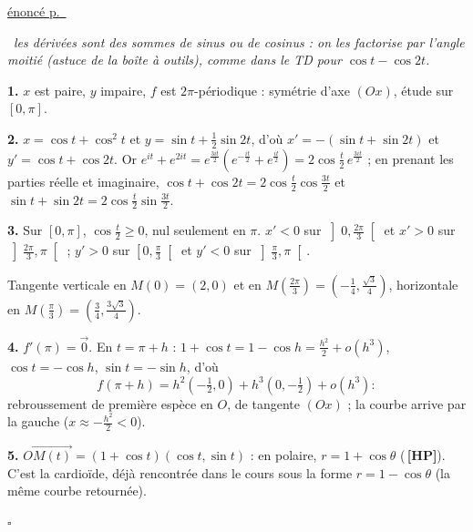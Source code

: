 \documentclass[a4paper,11pt]{article}
\numberwithin{equation}{section}
\numberwithin{figure}{section}
\numberwithin{table}{section}
\theoremstyle{enonce}
\theoremstyle{exemple}
\theoremstyle{remarque}
\newenvironment{corrige}[1]{%
  \par\needspace{6\baselineskip}\vspace{1em}\phantomsection\label{c:#1}%
  \noindent{\sffamily\bfseries\color{Bleu}Exercice~\ref{e:#1}}\quad
  {\scriptsize\sffamily\hyperref[e:#1]{\color{Gris}énoncé p.~\pageref{e:#1}}}\par\nobreak\vspace{0.2em}}%
  {\hfill\textcolor{BleuClair}{$\square$}\par}
\newcommand{\vv}[1]{\overrightarrow{#1}}
\newcommand{\ve}[1]{\vec{#1}}
\newcommand{\HP}{\,{\sffamily\bfseries\scriptsize\textcolor{Brique}{[HP]}}}
\newcommand{\demarche}[1]{\noindent{\sffamily\bfseries\small\color{BleuMoyen}Démarche.}\ \textit{#1}\par\smallskip}
\begin{document}
\begin{corrige}{cardio2}
\demarche{les dérivées sont des sommes de sinus ou de cosinus : on les factorise par l'angle moitié (astuce de la boîte à outils), comme dans le TD pour $\cos t-\cos2t$.}
\textbf{1.} $x$ est paire, $y$ impaire, $f$ est $2\pi$-périodique : symétrie d'axe $(Ox)$, étude sur $[0,\pi]$.

\textbf{2.} $x=\cos t+\cos^2t$ et $y=\sin t+\frac12\sin2t$, d'où $x'=-(\sin t+\sin2t)$ et $y'=\cos t+\cos2t$. Or
$e^{it}+e^{2it}=e^{\frac{3it}2}\left(e^{-\frac{it}2}+e^{\frac{it}2}\right)=2\cos\frac t2\,e^{\frac{3it}2}$ ; en prenant les
parties réelle et imaginaire, $\cos t+\cos2t=2\cos\frac t2\cos\frac{3t}2$ et $\sin t+\sin2t=2\cos\frac t2\sin\frac{3t}2$.

\textbf{3.} Sur $[0,\pi]$, $\cos\frac t2\geq0$, nul seulement en $\pi$. $x'<0$ sur $\left]0,\frac{2\pi}3\right[$ et $x'>0$ sur
$\left]\frac{2\pi}3,\pi\right[$ ; $y'>0$ sur $\left[0,\frac\pi3\right[$ et $y'<0$ sur $\left]\frac\pi3,\pi\right[$.
\begin{center}
\end{center}
Tangente verticale en $M(0)=(2,0)$ et en $M\left(\frac{2\pi}3\right)=\left(-\frac14,\frac{\sqrt3}4\right)$, horizontale en
$M\left(\frac\pi3\right)=\left(\frac34,\frac{3\sqrt3}4\right)$.

\textbf{4.} $f'(\pi)=\ve0$. En $t=\pi+h$ : $1+\cos t=1-\cos h=\frac{h^2}2+o(h^3)$, $\cos t=-\cos h$, $\sin t=-\sin h$, d'où
\[f(\pi+h)=h^2\left(-\tfrac12,0\right)+h^3\left(0,-\tfrac12\right)+o(h^3) :\]
rebroussement de première espèce en $O$, de tangente $(Ox)$ ; la courbe arrive par la gauche ($x\approx-\frac{h^2}2<0$).

\textbf{5.} $\vv{OM(t)}=(1+\cos t)(\cos t,\sin t)$ : en polaire, $r=1+\cos\theta$ (\HP). C'est la cardioïde, déjà
rencontrée dans le cours sous la forme $r=1-\cos\theta$ (la même courbe retournée).
\begin{center}
\end{center}
\end{corrige}
\end{document}
